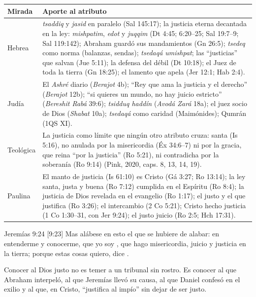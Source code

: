 \begin{center}\small\renewcommand{\arraystretch}{1.18}
\begin{tabular}{@{}L{2.4cm}L{11.4cm}@{}}
\toprule
\textbf{Mirada} & \textbf{Aporte al atributo} \\ \midrule
Hebrea & \emph{tsaddiq} y \emph{jasid} en paralelo (Sal 145:17); la justicia eterna decantada en la ley: \emph{mishpatim}, \emph{edot} y \emph{juqqim} (Dt 4:45; 6:20--25; Sal 19:7--9; Sal 119:142); Abraham guardó sus mandamientos (Gn 26:5); \emph{tsedeq} como norma (balanzas, sendas); \emph{tsedaqá umishpat}; las ``justicias'' que salvan (Jue 5:11); la defensa del débil (Dt 10:18); el Juez de toda la tierra (Gn 18:25); el lamento que apela (Jer 12:1; Hab 2:4). \\
Judía & El \emph{Ashré} diario (\emph{Berajot} 4b); ``Rey que ama la justicia y el derecho'' (\emph{Berajot} 12b); ``si quieres un mundo, no hay juicio estricto'' (\emph{Bereshit Rabá} 39:6); \emph{tsidduq haddín} (\emph{Avodá Zará} 18a); el juez socio de Dios (\emph{Shabat} 10a); \emph{tsedaqá} como caridad (Maimónides); Qumrán (1QS XI). \\
Teológica & La justicia como límite que ningún otro atributo cruza: santa (Is 5:16), no anulada por la misericordia (Éx 34:6--7) ni por la gracia, que reina ``por la justicia'' (Ro 5:21), ni contradicha por la soberanía (Ro 9:14) (Pink, 2020, caps. 8, 13, 14, 19). \\
Paulina & El manto de justicia (Is 61:10) es Cristo (Gá 3:27; Ro 13:14); la ley santa, justa y buena (Ro 7:12) cumplida en el Espíritu (Ro 8:4); la justicia de Dios revelada en el evangelio (Ro 1:17); el justo y el que justifica (Ro 3:26); el intercambio (2 Co 5:21); Cristo hecho justicia (1 Co 1:30--31, con Jer 9:24); el justo juicio (Ro 2:5; Hch 17:31). \\
\bottomrule
\end{tabular}\end{center}

\begin{verso}{Jeremías 9:24 [9:23]}
Mas alábese en esto el que se hubiere de alabar: en entenderme y conocerme, que yo soy \SENOR, que hago misericordia, juicio y justicia en la tierra; porque estas cosas quiero, dice \SENOR.
\end{verso}

Conocer al Dios justo no es temer a un tribunal sin rostro. Es conocer al que Abraham interpeló, al que Jeremías llevó su causa, al que Daniel confesó en el exilio y al que, en Cristo, ``justifica al impío'' sin dejar de ser justo.

